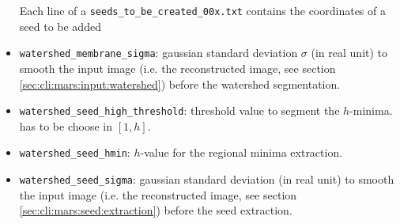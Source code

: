 \begin{itemize}
Each line of a \texttt{seeds\_to\_be\_created\_00x.txt} contains the coordinates of a seed to be added

\item \texttt{watershed\_membrane\_sigma}: gaussian standard deviation $\sigma$ (in real unit) to smooth the input image (i.e. the reconstructed image, see section \ref{sec:cli:mars:input:watershed}) before the watershed segmentation. 
\item \texttt{watershed\_seed\_high\_threshold}: threshold value to segment the $h$-minima. has to be choose in $[1,h]$. 
\item \texttt{watershed\_seed\_hmin}: $h$-value for the regional minima extraction.
\item \texttt{watershed\_seed\_sigma}: gaussian standard deviation (in real unit) to smooth the input image (i.e. the reconstructed image, see section \ref{sec:cli:mars:seed:extraction}) before the seed extraction.
\end{itemize}
